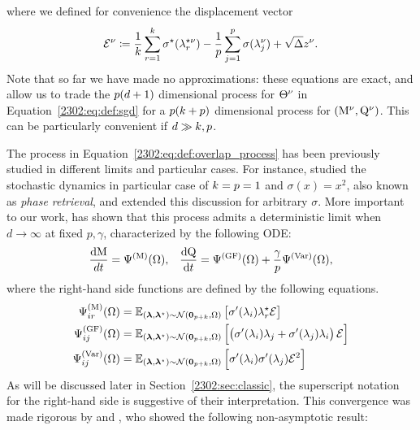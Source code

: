 where we defined for convenience the displacement vector 
\begin{equation}
\mathcal{E}^{\nu} \coloneqq \frac{1}{k}\sum_{r=1}^{k}\sigma^{\star}(\lambda_{r}^{\star\nu})-\frac{1}{p}\sum_{j=1}^{p}\sigma(\lambda_{j}^{\nu})+\sqrt{\Delta} z^{\nu}.
\end{equation}
Note that so far we have made no approximations: these equations are exact, and allow us to trade the $p(d+1)$ dimensional process for $\Theta^{\nu}$ in Equation~\eqref{2302:eq:def:sgd} for a $p(k+p)$ dimensional process for $(\mathrm{M}^{\nu},\mathrm{Q}^{\nu})$. This can be particularly convenient if $d\gg k, p$. 

The process in Equation~\eqref{2302:eq:def:overlap_process} has been previously studied in different limits and particular cases. For instance, \cite{tan2019online} studied the stochastic dynamics in particular case of $k=p=1$ and $\sigma(x)=x^2$, also known as \emph{phase retrieval}, and \cite{arous2021online} extended this discussion for arbitrary $\sigma$. More important to our work, \cite{saad1995line,saad1996dynamics} has shown that this process admits a deterministic limit when $d \to \infty$ at fixed $p,\gamma$, characterized by the following ODE:
\begin{align}
\label{2302:eq:def:ss_ode}
\frac{\text{d} \mathrm{M}}{dt} = \Psi^{(\mathrm{M})}(\Omega), &&
\frac{\text{d}\mathrm{Q}}{\text{d} t} =  \Psi^{(\mathrm{GF})}(\Omega) +\frac{\gamma}{p} \Psi^{(\mathrm{Var})}(\Omega),
\end{align}
where the right-hand side functions are defined by the following equations.
\begin{equation} \label{2302:eq:def:Psi}
\begin{split}
\Psi^{(\mathrm{M})}_{ir}(\Omega) &= \mathbb E_{({\boldsymbol{\lambda}},{\boldsymbol{\lambda}}^{\star})\sim\mathcal{N}({\boldsymbol{0}}_{p+k}, \Omega)} \left[\sigma'(\lambda_i)\lambda^{\star}_{r} \mathcal{E}\right]\\
\Psi^{(\mathrm{GF})}_{ij}(\Omega) &=  \mathbb E_{({\boldsymbol{\lambda}},{\boldsymbol{\lambda}}^{\star})\sim\mathcal{N}({\boldsymbol{0}}_{p+k}, \Omega)} \left[\left(\sigma'(\lambda_i)\lambda_{j}+\sigma'(\lambda_j)\lambda_{i}\right) \mathcal{E}\right] \\
\Psi^{(\mathrm{Var})}_{ij}(\Omega) &= \mathbb E_{({\boldsymbol{\lambda}},{\boldsymbol{\lambda}}^{\star})\sim\mathcal{N}({\boldsymbol{0}}_{p+k}, \Omega)} \left[\sigma'(\lambda_i)\sigma'(\lambda_j) {\mathcal{E}}^2 \right]
\end{split}
\end{equation}
As will be discussed later in Section~\ref{2302:sec:classic}, the superscript notation for the right-hand side is suggestive of their interpretation. This convergence was made rigorous by \cite{goldt2019dynamics} and \cite{veiga2022phase}, who showed the following non-asymptotic result:

